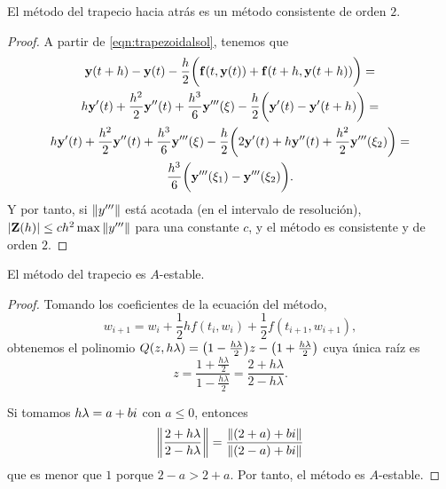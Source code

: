 \begin{proposition}
    El método del trapecio hacia atrás es un método consistente de orden $2$.
\end{proposition}

\begin{proof}
    A partir de \eqref{eqn:trapezoidalsol}, tenemos que 
    \begin{multline*}
        \vb{y}{}(t+h) - \vb{y}{}(t) - \frac{h}{2}\qty\bigg(
            \vb{f}{}(t, \vb{y}{}(t)) + \vb{f}{}(t+h, \vb{y}{}(t+h))
        ) = \\
        h\vb{y}{}'(t) + \frac{h^2}{2}\vb{y}{}''(t) + \frac{h^3}{6}\vb{y}{}'''(\xi)
            - \frac{h}{2}\qty\bigg(\vb{y}{}'(t) - \vb{y}{}'(t+h)) = \\
        h\vb{y}{}'(t) + \frac{h^2}{2}\vb{y}{}''(t) + \frac{h^3}{6}\vb{y}{}'''(\xi)
            - \frac{h}{2}\qty\bigg(2\vb{y}{}'(t) + h\vb{y}{}''(t)
            + \frac{h^2}{2}\vb{y}{}'''(\xi_2)) = \\
        \frac{h^3}{6}\qty\bigg(\vb{y}{}'''(\xi_1) - \vb{y}{}'''(\xi_2)).
    \end{multline*}
    Y por tanto, si $\norm{y'''}$ está acotada (en el intervalo de resolución),
    $\abs{\vb{Z}{}(h)} \le ch^2\max{\norm{y'''}}$
    para una constante $c$,
    y el método es consistente y de orden $2$.
\end{proof}

\begin{proposition}
    El método del trapecio es $A$-estable.
\end{proposition}

\begin{proof}
    Tomando los coeficientes de la ecuación del método,
    \begin{equation*}
        w_{i+1} = w_i + \frac{1}{2}hf(t_i, w_i) + \frac{1}{2}f(t_{i+1}, w_{i+1}),
    \end{equation*}
    obtenemos el polinomio
    $Q(z, h\lambda) = \qty(1 - \frac{h\lambda}{2})z - \qty(1 + \frac{h\lambda}{2})$
    cuya única raíz es
    \begin{equation*}
        z = \frac{1 + \frac{h\lambda}{2}}{1 - \frac{h\lambda}{2}} =
        \frac{2 + h\lambda}{2 - h\lambda}.
    \end{equation*}

    Si tomamos $h\lambda = a + bi$ con $a \le 0$, entonces
    \begin{equation*}
        \norm{\frac{2 + h\lambda}{2 - h\lambda}} =
        \frac{\norm{(2+a) + bi}}{\norm{(2-a) + bi}}
    \end{equation*}
    que es menor que $1$ porque $2 - a > 2 + a$.
    Por tanto, el método es $A$-estable.
\end{proof}

